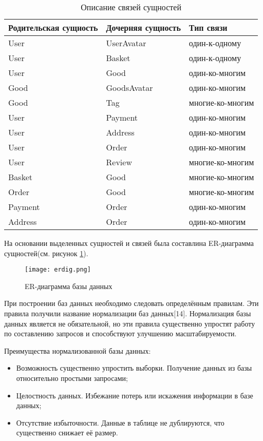 \begin{longtable}{ | l | l | l | }
    \caption{Описание связей сущностей}
    \label{opisanie:suw}
    \endfirsthead
    \endhead
    \hline
    Родительская сущность & Дочерняя сущность & Тип связи  \\ \hline
    User & UserAvatar & один-к-одному \\ \hline
    User & Basket & один-к-одному \\ \hline
    User & Good & один-ко-многим \\ \hline
    Good & GoodsAvatar & один-ко-многим \\ \hline
    Good & Tag & многие-ко-многим \\ \hline
    User & Payment & один-ко-многим \\ \hline
    User & Address & один-ко-многим \\ \hline
    User & Order & один-ко-многим \\ \hline
    User & Review & многие-ко-многим \\ \hline
    Basket & Good & многие-ко-многим \\ \hline
    Order & Good & многие-ко-многим  \\ \hline
    Payment & Order & один-ко-многим \\ \hline
    Address & Order & один-ко-многим \\
    \hline
\end{longtable}


На основании выделенных сущностей и связей была составлина ER-диаграмма сущностей(см. рисунок \ref{db:erdiag}).

\begin{figure}[!h]
    \centering
    \texttt{[image: erdig.png]}
    \caption{ER-диаграмма базы данных}
    \label{db:erdiag}
\end{figure}


При построении баз данных необходимо следовать определённым правилам.
Эти правила получили название нормализации баз данных[14].
Нормализация базы данных является не обязательной, но эти правила существенно упростят работу по составлению запросов и способствуют улучшению масштабируемости.

Преимущества нормализованной базы данных:
\begin{itemize}
    \item Возможность существенно упростить выборки. Получение данных из базы относительно простыми запросами;
    \item Целостность данных. Избежание потерь или искажения информации в базе данных;
    \item Отсутствие избыточности. Данные в таблице не дублируются, что существенно снижает её размер.
\end{itemize}

